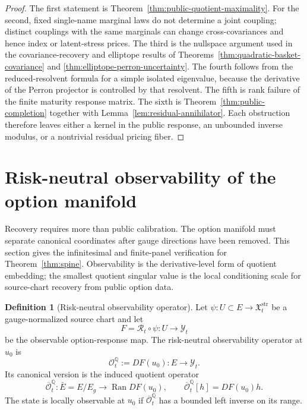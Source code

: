 \documentclass[11pt,a4paper]{amsart}
\theoremstyle{plain}
\theoremstyle{definition}
\newtheorem{definition}[theorem]{Definition}
\theoremstyle{remark}
\DeclareMathOperator{\Ran}{Ran}
\newcommand{\QQ}{\mathbb{Q}}
\newcommand{\cY}{\mathcal{Y}}
\begin{document}
\begin{proof}
The first statement is Theorem~\ref{thm:public-quotient-maximality}.  For the second, fixed
single-name marginal laws do not determine a joint coupling; distinct couplings with the same
marginals can change cross-covariances and hence index or latent-stress prices.  The third is the
nullspace argument used in the covariance-recovery and elliptope results of
Theorems~\ref{thm:quadratic-basket-covariance} and
\ref{thm:elliptope-perron-uncertainty}.  The fourth follows from the reduced-resolvent formula for
a simple isolated eigenvalue, because the derivative of the Perron projector is controlled by that
resolvent.  The fifth is rank failure of the finite maturity response matrix.  The sixth is
Theorem~\ref{thm:public-completion} together with Lemma~\ref{lem:residual-annihilator}.
Each obstruction therefore leaves either a kernel in the public response, an unbounded inverse
modulus, or a nontrivial residual pricing fiber.
\end{proof}

\section{Risk-neutral observability of the option manifold}\label{sec:observability}

Recovery requires more than public calibration.  The option manifold must separate canonical
coordinates after gauge directions have been removed.  This section gives the infinitesimal and
finite-panel verification for Theorem~\ref{thm:spine}.  Observability is the derivative-level form
of quotient embedding; the smallest quotient singular value is the local conditioning scale for
source-chart recovery from public option data.

\begin{definition}[Risk-neutral observability operator]\label{def:observability-operator}
Let \(\psi:U\subset E\to\mathfrak X_t^{\mathrm{str}}\) be a gauge-normalized source
chart and let
\[
        F=\mathcal R_t\circ\psi:U\to\cY_t
\]
be the observable option-response map.  The risk-neutral observability operator at \(u_0\) is
\[
        \mathcal O_t^\QQ:=DF(u_0):E\to\cY_t.
\]
Its canonical version is the induced quotient operator
\[
        \overline{\mathcal O}_t^\QQ:\bar E=E/E_g\to\Ran DF(u_0),
        \qquad
        \overline{\mathcal O}_t^\QQ [h]=DF(u_0)h .
\]
The state is locally observable at \(u_0\) if
\(\overline{\mathcal O}_t^\QQ\) has a bounded left inverse on its range.
\end{definition}
\end{document}
